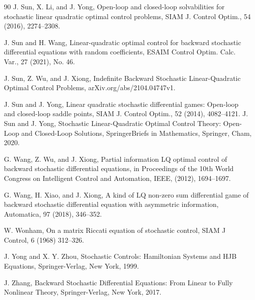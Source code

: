 \documentclass[11pt,times,twoside]{article}
\begin{document}
\begin{thebibliography}{90}
J. Sun, X. Li, and J. Yong,
Open-loop and closed-loop solvabilities for stochastic linear quadratic optimal control problems,
SIAM J. Control Optim., 54 (2016), 2274--2308.

 J. Sun and H. Wang,
 Linear-quadratic optimal control for backward stochastic differential equations with random coefficients,
 ESAIM Control Optim. Calc. Var., 27 (2021), No. 46.

J. Sun, Z. Wu, and J. Xiong,
Indefinite Backward Stochastic Linear-Quadratic Optimal Control Problems,
arXiv.org/abs/2104.04747v1.

J. Sun and J. Yong,
 Linear quadratic stochastic differential games: Open-loop and closed-loop saddle points,
 SIAM J. Control Optim.,
 52 (2014), 4082--4121.
%
J. Sun and J. Yong,
Stochastic Linear-Quadratic Optimal Control Theory: Open-Loop and Closed-Loop Solutions,
SpringerBriefs in Mathematics, Springer, Cham, 2020.

G. Wang, Z. Wu, and J. Xiong,
Partial information LQ optimal control of backward stochastic differential equations,
in Proceedings of the 10th World Congress on Intelligent Control and Automation,
IEEE, (2012),  1694--1697.

G. Wang, H. Xiao, and J. Xiong,
A kind of LQ non-zero sum differential game of backward stochastic differential equation
with asymmetric information,
Automatica, 97 (2018),  346--352.

W. Wonham,
On a matrix Riccati equation of stochastic control,
SIAM J Control, 6 (1968) 312--326.

%

J. Yong and X. Y. Zhou, Stochastic Controls: Hamiltonian Systems and HJB Equations,
Springer-Verlag, New York, 1999.

J. Zhang,
Backward Stochastic Differential Equations: From Linear to Fully Nonlinear Theory,
Springer-Verlag, New York, 2017.

\end{thebibliography}
\end{document}

